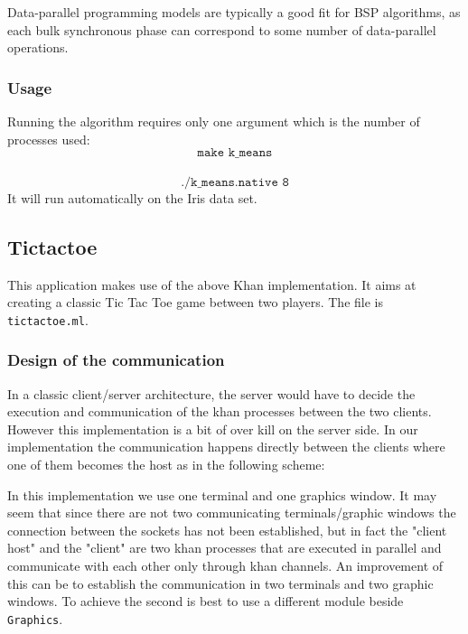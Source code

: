 \documentclass[10pt,a4paper]{article}
\begin{document}
Data-parallel programming models are typically a good fit for BSP algorithms, as each bulk synchronous phase can correspond to some number of data-parallel operations.


\subsubsection{Usage}

Running the algorithm requires only one argument which is the number of processes used: $$\texttt{make k\_means}$$ \\ $$\texttt{./k\_means.native 8}$$ 
It will run automatically on the Iris data set.

\subsection*{Tictactoe}

This application makes use of the above Khan implementation. It aims at creating a classic Tic Tac Toe game between two players. The file is \texttt{tictactoe.ml}.

\subsubsection{Design of the communication }

In a classic client/server architecture, the server would have to decide the execution and communication of the khan processes between the two clients. However this implementation is a bit of over kill on the server side. In our implementation the communication happens directly between the clients where one of them becomes the host as in the following scheme:


In this implementation we use one terminal and one graphics window. It may seem that since there are not two communicating terminals/graphic windows the connection between the sockets has not been established, but in fact the "client host" and the "client" are two khan processes that are executed in parallel and communicate with each other only through khan channels. An improvement of this can be to establish the communication in two terminals and two graphic windows. To achieve the second is best to use a different module beside \texttt{Graphics}. 
\end{document}
